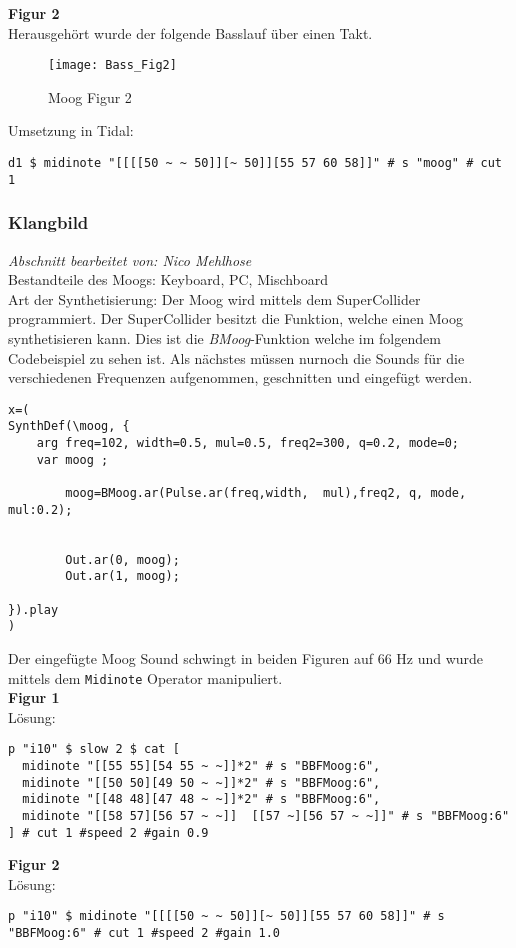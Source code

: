\documentclass[
10pt, %
a4paper, %
oneside, %
headinclude,footinclude, %
BCOR5mm, %
]{scrartcl}
\begin{document}
\noindent\textbf{Figur 2}\\
Herausgehört wurde der folgende Basslauf über einen Takt.
\begin{figure}[h]
	\centering 
	\texttt{[image: Bass\_Fig2]} 
	\caption{Moog Figur 2}
\end{figure}

\noindent Umsetzung in Tidal:
\begin{lstlisting}
d1 $ midinote "[[[[50 ~ ~ 50]][~ 50]][55 57 60 58]]" # s "moog" # cut 1
\end{lstlisting}

\subsubsection{Klangbild}
\textit{Abschnitt bearbeitet von: Nico Mehlhose}\\

\noindent Bestandteile des Moogs: Keyboard, PC, Mischboard\\
Art der Synthetisierung: Der Moog wird mittels dem SuperCollider programmiert. Der SuperCollider besitzt die Funktion, welche einen Moog synthetisieren kann.
Dies ist die \textit{BMoog}-Funktion welche im folgendem Codebeispiel zu sehen ist. Als nächstes müssen nurnoch die Sounds für die verschiedenen
Frequenzen aufgenommen, geschnitten und eingefügt werden.
\begin{lstlisting}
x=(
SynthDef(\moog, {
	arg freq=102, width=0.5, mul=0.5, freq2=300, q=0.2, mode=0;
	var moog ;
	
		moog=BMoog.ar(Pulse.ar(freq,width,  mul),freq2, q, mode, mul:0.2);
		
		
		Out.ar(0, moog);
		Out.ar(1, moog);
	
}).play
)
\end{lstlisting}
Der eingefügte Moog Sound schwingt in beiden Figuren auf 66 Hz und wurde mittels dem \verb|Midinote| Operator manipuliert.\\
\noindent\textbf{Figur 1}\\
Lösung:
\begin{lstlisting}
p "i10" $ slow 2 $ cat [
  midinote "[[55 55][54 55 ~ ~]]*2" # s "BBFMoog:6",
  midinote "[[50 50][49 50 ~ ~]]*2" # s "BBFMoog:6",
  midinote "[[48 48][47 48 ~ ~]]*2" # s "BBFMoog:6",
  midinote "[[58 57][56 57 ~ ~]]  [[57 ~][56 57 ~ ~]]" # s "BBFMoog:6"
] # cut 1 #speed 2 #gain 0.9
\end{lstlisting}
\noindent\textbf{Figur 2}\\
Lösung:
\begin{lstlisting}
p "i10" $ midinote "[[[[50 ~ ~ 50]][~ 50]][55 57 60 58]]" # s "BBFMoog:6" # cut 1 #speed 2 #gain 1.0
\end{lstlisting}
\end{document}
